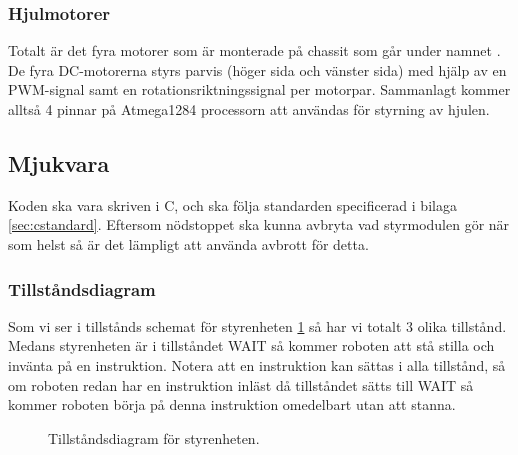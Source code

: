 \documentclass[a4paper,11pt]{article}
\begin{document}


\subsubsection{Hjulmotorer}
Totalt är det fyra motorer som är monterade på chassit som går under namnet \cite{terminator}. De fyra DC-motorerna styrs parvis (höger sida och vänster sida) med hjälp av en PWM-signal samt en rotationsriktningssignal per motorpar. Sammanlagt kommer alltså 4 pinnar på Atmega1284 processorn att användas för styrning av hjulen.

\subsection{Mjukvara}
Koden ska vara skriven i C, och ska följa standarden specificerad i bilaga \ref{sec:cstandard}. Eftersom nödstoppet ska kunna avbryta vad styrmodulen gör när som helst så är det lämpligt att använda avbrott för detta.

\subsubsection{Tillståndsdiagram}
Som vi ser i tillstånds schemat för styrenheten \ref{fig:stateDiagram} så har vi totalt 3 olika tillstånd. Medans styrenheten är i tillståndet WAIT så kommer roboten att stå stilla och invänta på en instruktion. Notera att en instruktion kan sättas i alla tillstånd, så om roboten redan har en instruktion inläst då tillståndet sätts till WAIT så kommer roboten börja på denna instruktion omedelbart utan att stanna.

\begin{figure}[h!]
	\caption{Tillståndsdiagram för styrenheten.}
	\label{fig:stateDiagram}
\end{figure}
\end{document}
